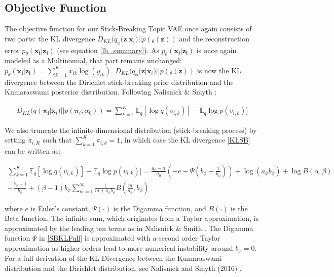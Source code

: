 \documentclass{report}
\begin{document}
\subsection{Objective Function}
The objective function for our Stick-Breaking Topic VAE once again consists of two parts: the KL divergence $D_{KL}(q_\phi (\mathbf{z}|\mathbf{x}_i)||p(_\theta(\mathbf{z}))$ and the reconstruction error $ p_\theta(\mathbf{x_i}|\mathbf{z_i})$ (see equation \ref{lb_summary}). As $ p_\theta(\mathbf{x_i}|\mathbf{z_i})$ is once again modeled as a Multinomial, that part remains unchanged:
$p_\theta(\mathbf{x_i}|\mathbf{z_i}) = \sum_{k=1}^K x_{ik} \log (y_{ik})$. $D_{KL}(q_\phi (\mathbf{z}|\mathbf{x}_i)||p(_\theta(\mathbf{z}))$ is now the KL divergence between the Dirichlet stick-breaking prior distribution and the Kumaraswami posterior distribution. Following Nalisnick \& Smyth \cite{nalisnick2016deep}:

\begin{align}\label{KLSB}
D_{KL}(q(\mathbf{\mathbf{\pi}_i}|\mathbf{x}_i)||p(\mathbf{\pi}_i;\alpha_0)) = \sum_{k=1}^{K}\mathbb{E}_q [\log q(v_{i,k})] - \mathbb{E}_q \log p(v_{i,k})]
\end{align}

We also truncate the infinite-dimensional distribution (stick-breaking process) by setting $\pi_{i,K}$ such that $\sum_{k=1}^{K}\pi_{i,k} = 1$, in which case the KL divergence \ref{KLSB} can be written as:

\begin{align}\label{SBKLFull}
\sum_{k=1}^{K}\mathbb{E}_q [\log q(v_{i,k})] - \mathbb{E}_q \log p(v_{i,k})] = \frac{a_0 -\alpha}{a_0}(-e-\Psi(b_\phi-\frac{1}{b_\phi}))+ \log(a_\phi b_\phi) + \log B(\alpha, \beta) \\
- \frac{b_\phi -1}{b_\phi} 
+ (\beta-1)b_\phi\sum_{m=1}^{\infty}\frac{1}{m+a_\phi b_\phi}B(\frac{m}{a_\phi},b_\phi)
\end{align}

where $e$ is Euler’s constant, $\Psi(\cdot)$ is the Digamma function, and $B(\cdot)$ is the Beta function.
The infinite sum, which originates from a Taylor approximation, is approximated by the leading ten terms as in Nalisnick \& Smith \cite{nalisnick2016deep}. The Digamma function $\Psi$ in \ref{SBKLFull} is approximated with a second order Taylor approximation as higher orders lead to more numerical instability around $b_\phi = 0$. \\
For a full derivation of the KL Divergence between the Kumaraswami distribution and the Dirichlet distribution, see Nalisnick and Smyth (2016) \cite{nalisnick2016deep}.
\end{document}
